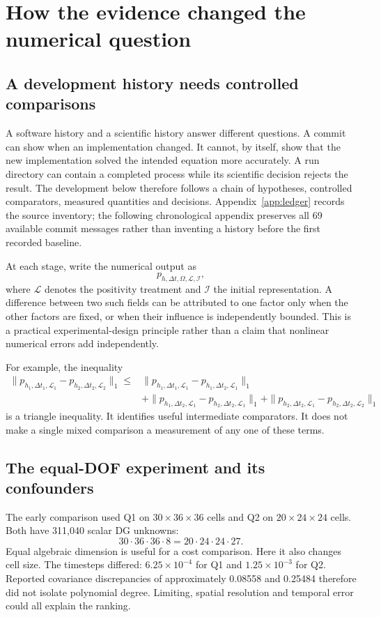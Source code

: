 \chapter{How the evidence changed the numerical question}
\section{A development history needs controlled comparisons}
A software history and a scientific history answer different questions. A commit can show when an implementation changed. It cannot, by itself, show that the new implementation solved the intended equation more accurately. A run directory can contain a completed process while its scientific decision rejects the result. The development below therefore follows a chain of hypotheses, controlled comparators, measured quantities and decisions. Appendix~\ref{app:ledger} records the source inventory; the following chronological appendix preserves all 69 available commit messages rather than inventing a history before the first recorded baseline.

At each stage, write the numerical output as
\begin{equation}
 p_{h,\Delta t,\Omega,\mathcal L,\mathcal I},
\end{equation}
where $\mathcal L$ denotes the positivity treatment and $\mathcal I$ the initial representation. A difference between two such fields can be attributed to one factor only when the other factors are fixed, or when their influence is independently bounded. This is a practical experimental-design principle rather than a claim that nonlinear numerical errors add independently.

For example, the inequality
\begin{align}
 \|p_{h_1,\Delta t_1,\mathcal L_1}-p_{h_2,\Delta t_2,\mathcal L_2}\|_1
 \le{}&\|p_{h_1,\Delta t_1,\mathcal L_1}-p_{h_1,\Delta t_2,\mathcal L_1}\|_1\\
 &+\|p_{h_1,\Delta t_2,\mathcal L_1}-p_{h_2,\Delta t_2,\mathcal L_1}\|_1
 +\|p_{h_2,\Delta t_2,\mathcal L_1}-p_{h_2,\Delta t_2,\mathcal L_2}\|_1
\end{align}
is a triangle inequality. It identifies useful intermediate comparators. It does not make a single mixed comparison a measurement of any one of these terms.

\section{The equal-DOF experiment and its confounders}
The early comparison used Q1 on $30\times36\times36$ cells and Q2 on $20\times24\times24$ cells. Both have 311,040 scalar DG unknowns:
\begin{equation}
 30\cdot36\cdot36\cdot8=20\cdot24\cdot24\cdot27.
\end{equation}
Equal algebraic dimension is useful for a cost comparison. Here it also changes cell size. The timesteps differed: $6.25\times10^{-4}$ for Q1 and $1.25\times10^{-3}$ for Q2. Reported covariance discrepancies of approximately 0.08558 and 0.25484 therefore did not isolate polynomial degree. Limiting, spatial resolution and temporal error could all explain the ranking.

